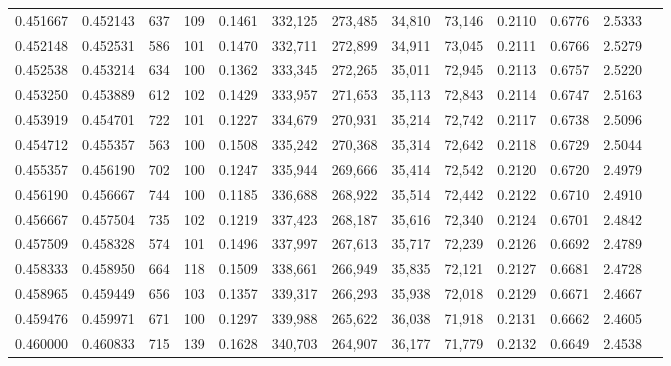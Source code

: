 \begin{tabular}{rrrrrrrrrrrrr}
0.451667 & 0.452143 &    637 &   109 &                                     0.1461 & 332,125 & 273,485 &  34,810 &  73,146 & 0.2110 & 0.6776 & 2.5333 \\
0.452148 & 0.452531 &    586 &   101 &                                     0.1470 & 332,711 & 272,899 &  34,911 &  73,045 & 0.2111 & 0.6766 & 2.5279 \\
0.452538 & 0.453214 &    634 &   100 &                                     0.1362 & 333,345 & 272,265 &  35,011 &  72,945 & 0.2113 & 0.6757 & 2.5220 \\
0.453250 & 0.453889 &    612 &   102 &                                     0.1429 & 333,957 & 271,653 &  35,113 &  72,843 & 0.2114 & 0.6747 & 2.5163 \\
0.453919 & 0.454701 &    722 &   101 &                                     0.1227 & 334,679 & 270,931 &  35,214 &  72,742 & 0.2117 & 0.6738 & 2.5096 \\
0.454712 & 0.455357 &    563 &   100 &                                     0.1508 & 335,242 & 270,368 &  35,314 &  72,642 & 0.2118 & 0.6729 & 2.5044 \\
0.455357 & 0.456190 &    702 &   100 &                                     0.1247 & 335,944 & 269,666 &  35,414 &  72,542 & 0.2120 & 0.6720 & 2.4979 \\
0.456190 & 0.456667 &    744 &   100 &                                     0.1185 & 336,688 & 268,922 &  35,514 &  72,442 & 0.2122 & 0.6710 & 2.4910 \\
0.456667 & 0.457504 &    735 &   102 &                                     0.1219 & 337,423 & 268,187 &  35,616 &  72,340 & 0.2124 & 0.6701 & 2.4842 \\
0.457509 & 0.458328 &    574 &   101 &                                     0.1496 & 337,997 & 267,613 &  35,717 &  72,239 & 0.2126 & 0.6692 & 2.4789 \\
0.458333 & 0.458950 &    664 &   118 &                                     0.1509 & 338,661 & 266,949 &  35,835 &  72,121 & 0.2127 & 0.6681 & 2.4728 \\
0.458965 & 0.459449 &    656 &   103 &                                     0.1357 & 339,317 & 266,293 &  35,938 &  72,018 & 0.2129 & 0.6671 & 2.4667 \\
0.459476 & 0.459971 &    671 &   100 &                                     0.1297 & 339,988 & 265,622 &  36,038 &  71,918 & 0.2131 & 0.6662 & 2.4605 \\
0.460000 & 0.460833 &    715 &   139 &                                     0.1628 & 340,703 & 264,907 &  36,177 &  71,779 & 0.2132 & 0.6649 & 2.4538 \\

\end{tabular}
